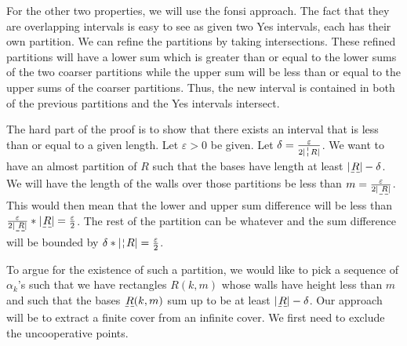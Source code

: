 \documentclass[12pt]{article}
\begin{document}
For the other two properties, we will use the fonsi approach. The fact that they are overlapping intervals is easy to see as given two Yes intervals, each has their own partition. We can refine the partitions by taking intersections. These refined partitions will have a lower sum which is greater than or equal to the lower sums of the two coarser partitions while the upper sum will be less than or equal to the upper sums of the coarser partitions. Thus, the new interval is contained in both of the previous partitions and the Yes intervals intersect. 

The hard part of the proof is to show that there exists an interval that is less than or equal to a given length. Let $\varepsilon > 0$ be given. Let $\delta = \frac{\varepsilon}{2|\wall{R}|}$. We want to have an almost partition of $R$ such that the bases have length at least $|\base{R}| - \delta$. We will have the length of the walls over those partitions be less than $m = \frac{\varepsilon}{2|\base{R}|}$. This would then mean that the lower and upper sum difference will be less than $\frac{\varepsilon}{2|\base{R}|} * |\base{R}| = \frac{\varepsilon}{2}$. The rest of the partition can be whatever and the sum difference will be bounded by $\delta * |\wall{R}| = \frac{\varepsilon}{2}$.

To argue for the existence of such a partition, we would like to pick a sequence of $\alpha_k$'s such that we have rectangles $R(k, m)$  whose walls have height less than $m$ and such that the bases $\base{R} (k, m)$ sum up to be at least $|\base{R}|-\delta$. Our approach will be to extract a finite cover from an infinite cover. We first need to exclude the uncooperative points. 
\end{document}
